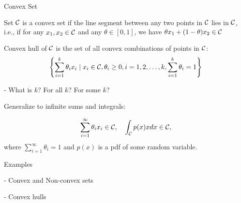 \documentclass[handout,fleqn,aspectratio=169]{beamer}
\begin{document}
\begin{frame}{Convex Set}

\plitemsep 0.1in

\bci 

\item Set $\mathcal C$ is a {\blue convex set} if the line segment between any
two points in $\mathcal C$ lies in $\mathcal C$, i.e.,  if for any $x_{1},x_{2}\in \mathcal C$
and any $\theta\in[0,1]$, we have $\theta x_{1} + (1-\theta)x_{2} \in \mathcal C$


\item {\blue Convex hull} of $\mathcal C$ is the set of all {\red convex combinations}
of points in $\mathcal C$:
\[
\left\{ \sum_{i=1}^{k}\theta_{i}x_{i} \mid x_{i}\in \mathcal C, \theta_{i}\geq
0, i=1,2,\ldots,k, \sum_{i=1}^{k}\theta_{i}=1 \right\}
\]

- What is $k$? For all $k$? For some $k$?

\item Generalize to infinite sums and integrals:

$$
\sum_{i=1}^\infty \theta_i x_i \in \mathcal C,  \quad \int_{\mathcal C} p(x) x dx \in \mathcal C,
$$
where $\sum_{i=1}^\infty \theta_i = 1$ and $p(x)$ is a pdf of some random variable.

\eci
\end{frame}

\begin{frame}{Examples}

- Convex and Non-convex sets


- Convex hulls


\end{frame}
\end{document}

